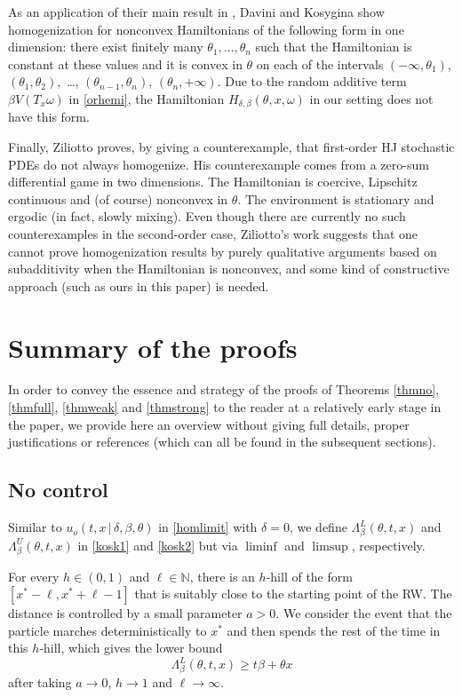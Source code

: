 \documentclass[a4paper]{amsart}
\numberwithin{equation}{section}
\theoremstyle{plain}
\theoremstyle{remark}
\begin{document}
As an application of their main result in \cite{DavKos_preprint}, Davini and Kosygina show homogenization for nonconvex Hamiltonians of the following form in one dimension: there exist finitely many $\theta_1,\ldots,\theta_n$ such that the Hamiltonian is constant at these values and it is convex in $\theta$ on each of the intervals $(-
\infty,\theta_1)$, $(\theta_1,\theta_2)$,\ \ldots, $(\theta_{n-1},\theta_n)$, $(\theta_n,+\infty)$. Due to the random additive term $\beta V(T_x\omega)$ in \eqref{orhemi}, the Hamiltonian $H_{\delta,\beta}(\theta,x,\omega)$ in our setting does not have this form.

Finally, Ziliotto \cite{Zil_preprint} proves,
by giving a counterexample,
that first-order HJ stochastic PDEs do not always homogenize. His counterexample comes from a zero-sum differential game in two dimensions. The Hamiltonian is coercive, Lipschitz continuous and (of course) nonconvex in $\theta$. The environment is stationary and ergodic (in fact, slowly mixing). Even though there are currently no such counterexamples in the second-order case, Ziliotto's work suggests that one cannot prove homogenization results by purely qualitative arguments based on subadditivity when the Hamiltonian is nonconvex, and some kind of constructive approach (such as ours in this paper) is needed.

\section{Summary of the proofs}\label{subsecstrategy}

In order to convey the essence and strategy of the proofs of Theorems \ref{thmno}, \ref{thmfull}, \ref{thmweak} and \ref{thmstrong} to the reader at a relatively early stage in the paper, we provide here an overview without giving full details, proper justifications or references (which can all be found in the subsequent sections).

\subsection{No control}\label{summ1}

Similar to $u_o(t,x\,|\,\delta,\beta,\theta)$ in \eqref{homlimit} with $\delta=0$, we define $\Lambda_\beta^L(\theta,t,x)$ and $\Lambda_\beta^U(\theta,t,x)$ in \eqref{kosk1} and \eqref{kosk2} but via $\liminf$ and $\limsup$, respectively.

For every $h\in(0,1)$ and $\ell\in\mathbb{N}$, there is an $h$-hill of the form $[x^*-\ell,x^*+\ell-1]$ that is suitably close to the starting point of the RW. The distance is controlled by a small parameter $a>0$. We consider the event that the particle marches deterministically to $x^*$ and then spends the rest of the time in this $h$-hill, which gives the lower bound \begin{equation}\label{oakar}
\Lambda_\beta^L(\theta,t,x) \ge t\beta + \theta x
\end{equation}
after taking $a\to0$, $h\to1$ and $\ell\to\infty$.
 
\end{document}
